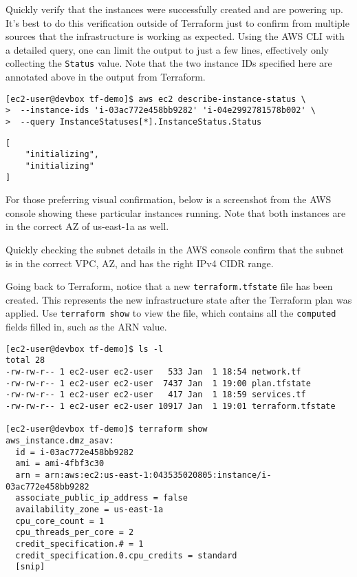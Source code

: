Quickly verify that the instances were successfully created and are powering
up. It's best to do this verification outside of Terraform just to confirm
from multiple sources that the infrastructure is working as expected\@. Using
the AWS CLI with a detailed query, one can limit the output to just a few
lines, effectively only collecting the \verb|Status| value. Note that the two
instance IDs specified here are annotated above in the output from Terraform.

\begin{verbatim}
[ec2-user@devbox tf-demo]$ aws ec2 describe-instance-status \
>  --instance-ids 'i-03ac772e458bb9282' 'i-04e2992781578b002' \
>  --query InstanceStatuses[*].InstanceStatus.Status
\end{verbatim}

\begin{verbatim}
[
    "initializing",
    "initializing"
]
\end{verbatim}

For those preferring visual confirmation, below is a screenshot from the AWS
console showing these particular instances running. Note that both instances
are in the correct AZ of us-east-1a as well.


Quickly checking the subnet details in the AWS console confirm that the subnet
is in the correct VPC, AZ, and has the right IPv4 CIDR range.


Going back to Terraform, notice that a new \verb|terraform.tfstate| file has
been created. This represents the new infrastructure state after the Terraform
plan was applied. Use \verb|terraform show| to view the file, which contains
all the \verb|computed| fields filled in, such as the ARN value.

\begin{verbatim}
[ec2-user@devbox tf-demo]$ ls -l
total 28
-rw-rw-r-- 1 ec2-user ec2-user   533 Jan  1 18:54 network.tf
-rw-rw-r-- 1 ec2-user ec2-user  7437 Jan  1 19:00 plan.tfstate
-rw-rw-r-- 1 ec2-user ec2-user   417 Jan  1 18:59 services.tf
-rw-rw-r-- 1 ec2-user ec2-user 10917 Jan  1 19:01 terraform.tfstate

[ec2-user@devbox tf-demo]$ terraform show
aws_instance.dmz_asav:
  id = i-03ac772e458bb9282
  ami = ami-4fbf3c30
  arn = arn:aws:ec2:us-east-1:043535020805:instance/i-03ac772e458bb9282
  associate_public_ip_address = false
  availability_zone = us-east-1a
  cpu_core_count = 1
  cpu_threads_per_core = 2
  credit_specification.# = 1
  credit_specification.0.cpu_credits = standard
  [snip]
\end{verbatim}

